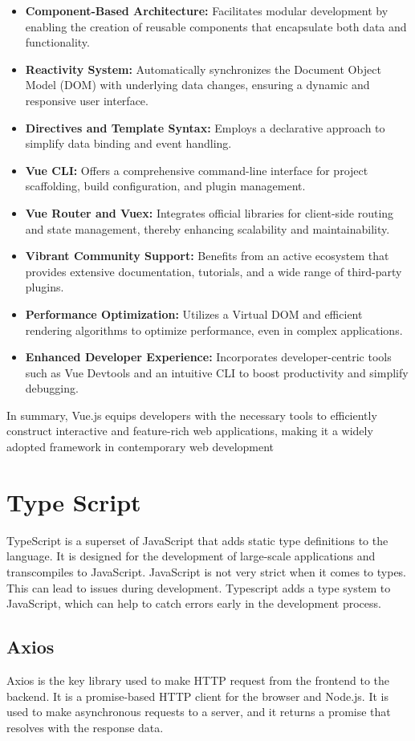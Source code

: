 \begin{itemize}
    \item \textbf{Component-Based Architecture:} Facilitates modular development by enabling the creation of reusable components that encapsulate both data and functionality.
    \item \textbf{Reactivity System:} Automatically synchronizes the Document Object Model (DOM) with underlying data changes, ensuring a dynamic and responsive user interface.
    \item \textbf{Directives and Template Syntax:} Employs a declarative approach to simplify data binding and event handling.
    \item \textbf{Vue CLI:} Offers a comprehensive command-line interface for project scaffolding, build configuration, and plugin management.
    \item \textbf{Vue Router and Vuex:} Integrates official libraries for client-side routing and state management, thereby enhancing scalability and maintainability.
    \item \textbf{Vibrant Community Support:} Benefits from an active ecosystem that provides extensive documentation, tutorials, and a wide range of third-party plugins.
    \item \textbf{Performance Optimization:} Utilizes a Virtual DOM and efficient rendering algorithms to optimize performance, even in complex applications.
    \item \textbf{Enhanced Developer Experience:} Incorporates developer-centric tools such as Vue Devtools and an intuitive CLI to boost productivity and simplify debugging.
\end{itemize}

In summary, Vue.js equips developers with the necessary tools to efficiently construct interactive and feature-rich web applications, making it a widely adopted framework in contemporary web development 

\cite{vuejs_docs}

\section{Type Script}
\label{sec:TypeScript}

TypeScript is a superset of JavaScript that adds static type definitions to the language. It is designed for the development of large-scale applications and transcompiles to JavaScript.
JavaScript is not very strict when it comes to types. This can lead to issues during development. Typescript adds a type system to JavaScript, which can help to catch errors early in the development process.



\subsection{Axios}
Axios is the key library used to make HTTP request from the frontend to the backend. It is a promise-based HTTP client for the browser and Node.js. It is used to make asynchronous requests to a server, and it returns a promise that resolves with the response data. 

\cite{axios_docs}

